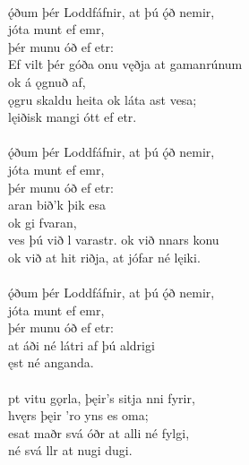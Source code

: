  \\

\bva {}ǫ́ðum þér Loddfáfnir, \hld at þú ǫ́ð nemir, \\%
\ind {}jóta munt ef emr, \\%
\ind þér munu óð ef etr: \\%
Ef vilt þér góða onu \hld {}vęðja at gamanrúnum \\%
\ind ok á ǫgnuð af, \\%
ǫgru skaldu heita \hld ok láta ast vesa; \\%
\ind lęiðisk mangi ótt ef etr.\\%

 \\

\bva {}ǫ́ðum þér Loddfáfnir, \hld at þú ǫ́ð nemir, \\%
\ind {}jóta munt ef emr, \\%
\ind þér munu óð ef etr: \\%
\ind {}aran bið'k þik esa \\%
\ind ok gi fvaran, \\%
ves þú við l varastr. \hld ok við nnars konu \\%
ok við at hit riðja, \hld at jófar né lęiki.\\%

 \\

\bva {}ǫ́ðum þér Loddfáfnir, \hld at þú ǫ́ð nemir, \\%
\ind {}jóta munt ef emr, \\%
\ind þér munu óð ef etr: \\%
at áði né látri \hld {}af þú aldrigi \\%
\ind {}ęst né anganda.\\%

 \\

\bva {}pt vitu gǫrla, \hld þęir's sitja nni fyrir, \\%
\ind hvęrs þęir 'ro yns es oma; \\%
esat maðr svá óðr \hld at alli né fylgi, \\%
\ind né svá llr at nugi dugi.\\%

